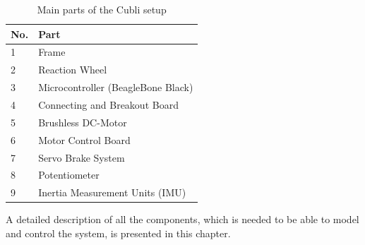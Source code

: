\begin{table}[H]
	\centering
	\begin{tabular}{|l|p{6.4cm}|}
		\hline %
		\textbf{No.} &\textbf{Part} 			\\
		\hline %
		1            & Frame           			\\
		\hline %
		2            & Reaction Wheel      		\\
		\hline %
		3            & Microcontroller (BeagleBone Black)  \\
		\hline %
		4            & Connecting and Breakout Board 			\\
		\hline %
		5            & Brushless DC-Motor       			\\
		\hline %
		6            & Motor Control Board   	\\
		\hline %
		7            & Servo Brake System     	\\
		\hline %
		8            & Potentiometer 		    	\\
		\hline %
		9            & Inertia Measurement Units (IMU) 		    	\\
		\hline %
	\end{tabular}
	\caption{Main parts of the Cubli setup}
	\label{tab:TableAAUCubliComponent}
\end{table}
%
A detailed description of all the components, which is needed to be able to model and control the system, is presented in this chapter.


